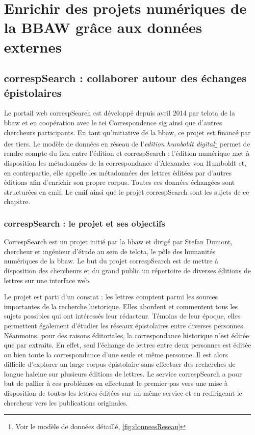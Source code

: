 \documentclass[a4paper, 12pt, twoside]{book}
\begin{document}
\part{Enrichir des projets numériques de la BBAW grâce aux données externes}

\chapter{correspSearch : collaborer autour des échanges épistolaires}
\label{chap:cSBesoins}
Le portail web correspSearch est développé depuis avril 2014 par \gls{telota} de la \gls{bbaw} et en coopération avec le \gls{tei} Correspondence \gls{sig} ainsi que d'autres chercheurs participants. En tant qu'initiative de la \gls{bbaw}, ce projet est financé par des tiers. 
Le modèle de données en réseau de l'\textit{edition humboldt digital}\footnote{Voir le modèle de données détaillé, \autoref{fig:donneesReseau}} permet de rendre compte du lien entre l'édition et correspSearch : l'édition numérique met à disposition les métadonnées de la correspondance d'Alexander von Humboldt et, en contrepartie, elle appelle les métadonnées des lettres éditées par d'autres éditions afin d'enrichir son propre corpus. Toutes ces données échangées sont structurées en \gls{cmif}. Le \gls{cmif} ainsi que le projet correspSearch sont les sujets de ce chapitre. 


\section{correspSearch : le projet et ses objectifs}
CorrespSearch est un projet initié par la \gls{bbaw} et dirigé par \href{https://www.bbaw.de/die-akademie/mitarbeiterinnen-mitarbeiter/dumont-stefan}{Stefan Dumont}, chercheur et ingénieur d'étude au sein de \gls{telota}, le pôle des humanités numériques de la \gls{bbaw}. Le but du projet correspSearch est de mettre à disposition des chercheurs et du grand public un répertoire de diverses éditions de lettres sur une interface web.

Le projet est parti d'un constat : les lettres comptent parmi les sources importantes de la recherche historique. Elles abordent et commentent tous les sujets possibles qui ont intéressés leur rédacteur. Témoins de leur époque, elles permettent également d'étudier les réseaux épistolaires entre diverses personnes. Néanmoins, pour des raisons éditoriales, la correspondance historique n'est éditée que par extraits. En effet, seul l'échange de lettres entre deux personnes est éditée ou bien toute la correspondance d'une seule et même personne. Il est alors difficile d'explorer un large corpus épistolaire sans effectuer des recherches de longue haleine sur plusieurs éditions de lettres. Le service correspSearch a pour but de pallier à ces problèmes en effectuant le premier pas vers une mise à disposition de toutes les lettres éditées sur un même service et en redirigeant le chercheur vers les publications originales.
\end{document}

